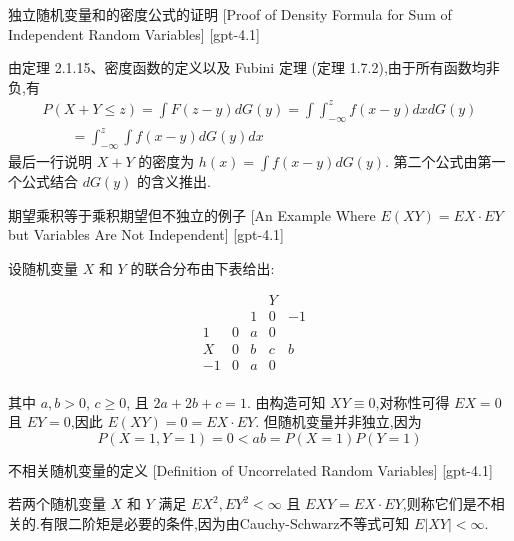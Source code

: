 \documentclass[UTF8]{ctexart}
\begin{document}
    
    
    \begin{prf}
        {独立随机变量和的密度公式的证明}
        [Proof of Density Formula for Sum of Independent Random Variables]
        [gpt-4.1]
        
由定理 2.1.15、密度函数的定义以及 Fubini 定理 (定理 1.7.2),由于所有函数均非负,有
\[
\begin{array}{l}
P(X + Y \leq z) = \displaystyle \int F(z - y) dG(y) = \int \int_{-\infty}^{z} f(x - y) dx dG(y) \\
\qquad = \int_{-\infty}^{z} \int f(x - y) dG(y) dx
\end{array}
\]
最后一行说明 $X + Y$ 的密度为 $h(x) = \int f(x - y) dG(y)$.
第二个公式由第一个公式结合 $dG(y)$ 的含义推出.

    \end{prf}
    
    
    
    \begin{xmp}
        [An-Example-Where-$EXY-=-EX-\cdot-EY$-but-Variables-Are-Not-Independent]
        {期望乘积等于乘积期望但不独立的例子}
        [An Example Where $E(XY) = EX \cdot EY$ but Variables Are Not Independent]
        [gpt-4.1]
        
设随机变量 $X$ 和 $Y$ 的联合分布由下表给出:

\[
\begin{array}{cccccc}
& & & Y & & \\
& & 1 & 0 & -1 & \\
1 & 0 & a & 0 & \\
X & 0 & b & c & b \\
-1 & 0 & a & 0 & \\
\end{array}
\]

其中 $a, b > 0$, $c \geq 0$, 且 $2a + 2b + c = 1$.
由构造可知 $XY \equiv 0$,对称性可得 $EX = 0$ 且 $EY = 0$,因此 $E(XY) = 0 = EX \cdot EY$.
但随机变量并非独立,因为
\[
P(X = 1, Y = 1) = 0 < ab = P(X = 1)P(Y = 1)
\]

    \end{xmp}
    
    
    
    \begin{dfn}
        {不相关随机变量的定义}
        [Definition of Uncorrelated Random Variables]
        [gpt-4.1]
        
若两个随机变量 $X$ 和 $Y$ 满足 $EX^2, EY^2 < \infty$ 且 $EXY = EX \cdot EY$,则称它们是不相关的.有限二阶矩是必要的条件,因为由Cauchy-Schwarz不等式可知 $E|XY| < \infty$.

    \end{dfn}
    
\end{document}
